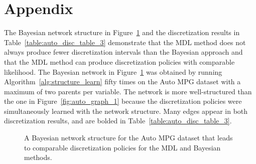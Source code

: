 




\section*{Appendix}
\label{sec:appendix}

The Bayesian network structure in Figure~\ref{fig:auto_graph_3} and the discretization results in Table~\ref{table:auto_disc_table_3} demonstrate that the MDL method does not always produce fewer discretization intervals than the Bayesian approach and that the MDL method can produce discretization policies with comparable likelihood.
The Bayesian network in Figure~\ref{fig:auto_graph_3} was obtained by running Algorithm~\ref{alg:structure_learn} fifty times on the Auto MPG dataset with a maximum of two parents per variable.
The network is more well-structured than the one in Figure~\ref{fig:auto_graph_1} because the discretization policies were simultaneously learned with the network structure.
Many edges appear in both discretization results, and are bolded in Table~\ref{table:auto_disc_table_3}.

\begin{figure}[ht]
  \centering
  \scalebox{0.8}{}
  \caption{A Bayesian network structure for the Auto MPG dataset that leads to comparable discretization policies for the MDL and Bayesian methods.}
  \label{fig:auto_graph_3}
\end{figure}

\begin{table}[ht]
  \centering
  \caption{
    The discretization policies for the Auto MPG dataset with the fixed structure shown in Figure~\ref{fig:auto_graph_3}.
    The first five rows list the discretization edges for each continuous variable.
    The last row shows the mean cross-validated log-likelihood under each policy.
    The methods have the same discretization for variable $A$, and the log-likelihood for the Bayesian method is only slightly better than that for the MDL method.
  }

  \label{table:auto_disc_table_3}
\end{table}



